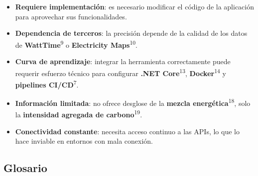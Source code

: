 \documentclass[12pt,a4paper]{report}
\begin{document}
\begin{itemize}
  \item \textbf{Requiere implementación}: es necesario modificar el código de la aplicación para aprovechar sus funcionalidades.
  \item \textbf{Dependencia de terceros}: la precisión depende de la calidad de los datos de \textbf{WattTime}\textsuperscript{9} o \textbf{Electricity Maps}\textsuperscript{10}.
  \item \textbf{Curva de aprendizaje}: integrar la herramienta correctamente puede requerir esfuerzo técnico para configurar \textbf{.NET Core}\textsuperscript{13}, \textbf{Docker}\textsuperscript{14} y \textbf{pipelines CI/CD}\textsuperscript{7}.
  \item \textbf{Información limitada}: no ofrece desglose de la \textbf{mezcla energética}\textsuperscript{18}, solo la \textbf{intensidad agregada de carbono}\textsuperscript{19}.
  \item \textbf{Conectividad constante}: necesita acceso continuo a las APIs, lo que lo hace inviable en entornos con mala conexión.
\end{itemize}

\subsection*{Glosario}
\end{document}
